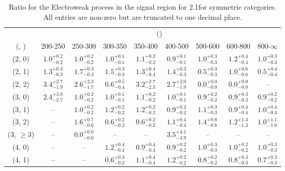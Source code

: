 \begin{table}[h!]
\tiny
\centering
\caption{Ratio for the Electroweak process in the signal region for 2.1\ifb for symmetric categories. All entries are non-zero but are truncated to one decimal place.\label{tab:ratiosepnaive_sig_ewk_sym}}
\begin{tabular}
{ccccccccc}
	\hline\hline
	& \multicolumn{8}{c}{\scalht (\gev)} \\ 
	 (\njet,  \nb) & 200-250 & 250-300 & 300-350 & 350-400 & 400-500 & 500-600 & 600-800 & 800-$\infty$ \\ [0.8ex] 
\hline
	(2, 0) & $1.0^{+ 0.2 }_{- 0.2 }$ & $1.0^{+ 0.2 }_{- 0.2 }$ & $1.0^{+ 0.1 }_{- 0.1 }$ & $1.1^{+ 0.2 }_{- 0.2 }$ & $0.9^{+ 0.1 }_{- 0.1 }$ & $1.0^{+ 0.3 }_{- 0.3 }$ & $1.2^{+ 0.4 }_{- 0.4 }$ & $1.0^{+ 0.3 }_{- 0.3 }$ \\[0.5ex] 
	(2, 1) & $1.3^{+ 0.3 }_{- 0.3 }$ & $1.7^{+ 0.3 }_{- 0.3 }$ & $1.5^{+ 0.3 }_{- 0.3 }$ & $1.3^{+ 0.4 }_{- 0.4 }$ & $1.4^{+ 0.3 }_{- 0.3 }$ & $0.5^{+ 0.3 }_{- 0.3 }$ & $1.0^{+ 0.6 }_{- 0.6 }$ & $0.5^{+ 0.4 }_{- 0.4 }$ \\[0.5ex] 
	(2, 2) & $3.4^{+ 2.7 }_{- 1.9 }$ & $2.6^{+ 2.3 }_{- 1.7 }$ & $0.6^{+ 0.5 }_{- 0.4 }$ & $3.2^{+ 2.7 }_{- 2.3 }$ & $2.7^{+ 2.0 }_{- 1.9 }$ & $0.0^{+ 0.0 }_{- 0.0 }$ & $0.0^{+ 0.0 }_{- 0.0 }$ & -- \\[0.5ex] 
	(3, 0) & $2.4^{+ 3.8 }_{- 2.7 }$ & $1.0^{+ 0.2 }_{- 0.2 }$ & $1.0^{+ 0.1 }_{- 0.1 }$ & $1.1^{+ 0.2 }_{- 0.2 }$ & $1.0^{+ 0.1 }_{- 0.1 }$ & $0.9^{+ 0.2 }_{- 0.2 }$ & $0.9^{+ 0.3 }_{- 0.3 }$ & $0.9^{+ 0.2 }_{- 0.2 }$ \\[0.5ex] 
	(3, 1) & -- & $1.0^{+ 0.2 }_{- 0.2 }$ & $1.2^{+ 0.2 }_{- 0.2 }$ & $1.2^{+ 0.2 }_{- 0.2 }$ & $0.9^{+ 0.2 }_{- 0.2 }$ & $1.1^{+ 0.3 }_{- 0.3 }$ & $0.9^{+ 0.4 }_{- 0.4 }$ & $1.0^{+ 0.4 }_{- 0.4 }$ \\[0.5ex] 
	(3, 2) & -- & $1.6^{+ 0.7 }_{- 0.6 }$ & $0.6^{+ 0.2 }_{- 0.2 }$ & $0.6^{+ 0.2 }_{- 0.2 }$ & $1.1^{+ 0.4 }_{- 0.4 }$ & $1.4^{+ 0.8 }_{- 0.8 }$ & $1.2^{+ 1.3 }_{- 1.3 }$ & $1.0^{+ 1.1 }_{- 1.0 }$ \\[0.5ex] 
	(3, $\ge3$) & -- & $0.0^{+ 0.0 }_{- 0.0 }$ & -- & -- & $3.5^{+ 4.1 }_{- 3.9 }$ & -- & -- & -- \\[0.5ex] 
	(4, 0) & -- & -- & $1.2^{+ 0.4 }_{- 0.4 }$ & $0.9^{+ 0.4 }_{- 0.4 }$ & $0.9^{+ 0.2 }_{- 0.2 }$ & $1.0^{+ 0.3 }_{- 0.3 }$ & $1.0^{+ 0.2 }_{- 0.2 }$ & $1.0^{+ 0.3 }_{- 0.3 }$ \\[0.5ex] 
	(4, 1) & -- & -- & $0.6^{+ 0.3 }_{- 0.2 }$ & $1.1^{+ 0.4 }_{- 0.4 }$ & $1.2^{+ 0.2 }_{- 0.2 }$ & $0.8^{+ 0.2 }_{- 0.2 }$ & $0.8^{+ 0.3 }_{- 0.3 }$ & $0.7^{+ 0.3 }_{- 0.3 }$ \\[0.5ex] 

\end{tabular}
\end{table}
